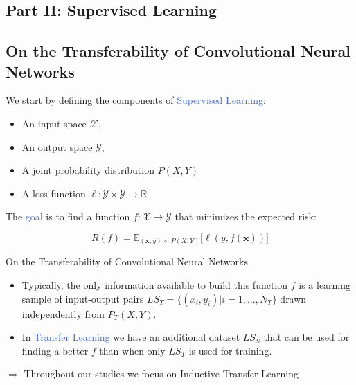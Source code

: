 \documentclass{beamer}
\renewcommand{\vec}[1]{\mathbf{#1}
}
\begin{document}
\begin{frame}
	\section{Part II: Supervised Learning}
	\subsection{On the Transferability of Convolutional Neural Networks}

	We start by defining the components of \textcolor{RoyalBlue}{Supervised Learning}:

	\begin{itemize}
		\item An input space $\mathcal{X}$,
		\item An output space $\mathcal{Y}$,
		\item A joint probability distribution $P(X,Y)$
		\item A loss function $\ell: \mathcal{Y} \times \mathcal{Y} \rightarrow \mathds{R}$
	\end{itemize}

	\bigskip

	The \textcolor{RoyalBlue}{goal} is to find a function $f:\mathcal{X}\rightarrow\mathcal{Y}$ that minimizes the expected risk:

	\begin{equation*}
		R(f) = \mathds{E}_{(\vec{x},y)\sim P(X,Y)} \big[\ell(y,f(\vec{x}))\big]
	\end{equation*}
\end{frame}

\begin{frame}{On the Transferability of Convolutional Neural Networks}
	\bigskip

	 \begin{itemize}
	 	\item Typically, the only information available to build this function $f$ is a learning sample of input-output pairs $LS_T=\{(x_i,y_i)|i=1,\ldots,N_T\}$ drawn independently from $P_T(X,Y)$.

		\bigskip
	\item In \textcolor{RoyalBlue}{Transfer Learning} we have an additional dataset $LS_S$ that can be used for finding a better $f$ than when only $LS_T$ is used for training. 
	 \end{itemize}
	 \bigskip
	 $\Rightarrow$ Throughout our studies we focus on Inductive Transfer Learning 
	 
\end{frame}
\end{document}
